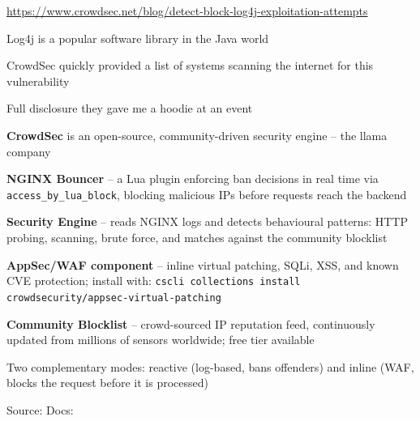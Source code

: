 \documentclass[Screen16to9,17pt]{foils}
\begin{document}
\url{https://www.crowdsec.net/blog/detect-block-log4j-exploitation-attempts}


\begin{list2}
\item Log4j is a popular software library in the Java world
\item CrowdSec quickly provided a list of systems scanning the internet for this vulnerability\\
\item Full disclosure they gave me a hoodie at an event \smiley
\end{list2}




\begin{list2}
\item {\bf CrowdSec} is an open-source, community-driven security engine -- the llama company 
\item {\bf NGINX Bouncer} -- a Lua plugin enforcing ban decisions in real time via \verb+access_by_lua_block+,
blocking malicious IPs before requests reach the backend
\item {\bf Security Engine} -- reads NGINX logs and detects behavioural patterns: HTTP probing,
scanning, brute force, and matches against the community blocklist
\item {\bf AppSec/WAF component} -- inline virtual patching, SQLi, XSS, and known CVE protection;
install with:
\verb+cscli collections install crowdsecurity/appsec-virtual-patching+
\item {\bf Community Blocklist} -- crowd-sourced IP reputation feed, continuously updated from
millions of sensors worldwide; free tier available
\item Two complementary modes: reactive (log-based, bans offenders) and
inline (WAF, blocks the request before it is processed)
\end{list2}
Source: Docs: 


\end{document}
